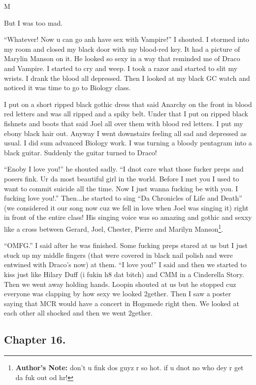 M\documentclass{article}
\begin{document}
But I was too mad.

“Whatever! Now u can go anh have sex with Vampire!” I shouted. I stormed into my room and closed my black door with my blood-red key. It had a picture of Marylin Manson on it. He looked so sexy in a way that reminded me of Draco and Vampire. I started to cry and weep. I took a razor and started to slit my wrists. I drank the blood all depressed. Then I looked at my black GC watch and noticed it was time to go to Biology class.

I put on a short ripped black gothic dress that said Anarchy on the front in blood red letters and was all ripped and a spiky belt. Under that I put on ripped black fishnets and boots that said Joel all over them with blood red letters. I put my ebony black hair out. Anyway I went downstairs feeling all sad and depressed as usual. I did sum advanced Biology work. I was turning a bloody pentagram into a black guitar. Suddenly the guitar turned to Draco!

“Enoby I love you!” he shouted sadly. “I dnot care what those fucker preps and posers fink. Ur da most beautiful girl in the world. Before I met you I used to want to commit suicide all the time. Now I just wanna fucking be with you. I fucking love you!.” Then...he started to sing “Da Chronicles of Life and Death” (we considered it our song now cuz we fell in love when Joel was singing it) right in front of the entire class! His singing voice was so amazing and gothic and sexxy like a cross between Gerard, Joel, Chester, Pierre and Marilyn Manson\footnote{\textbf{Author's Note: }don’t u fink dos guyz r so hot. if u dnot no who dey r get da fuk out od hr!}.

“OMFG.” I said after he was finished. Some fucking preps stared at us but I just stuck up my middle fingers (that were covered in black nail polish and were entwined with Draco’s now) at them. “I love you!” I said and then we started to kiss just like Hilary Duff (i fukin h8 dat bitch) and CMM in a Cinderella Story. Then we went away holding hands. Loopin shouted at us but he stopped cuz everyone was clapping by how sexy we looked 2gether. Then I saw a poster saying that MCR would have a concert in Hogsmede right then. We looked at each other all shocked and then we went 2gether.

\clearpage\nolinenumbers
\subsection*{Chapter 16.}
\end{document}
